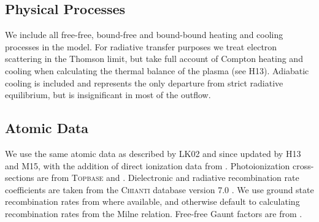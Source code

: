\documentclass[preprint, a4paper, 11pt]{aastex}
\begin{document}
\subsection{Physical Processes}

We include all free-free, bound-free and bound-bound heating
and cooling processes in the model. For radiative transfer purposes
we treat electron scattering in the Thomson limit, 
but take full account of Compton heating and cooling when
calculating the thermal balance of the plasma (see H13).
Adiabatic cooling is included and represents the only
departure from strict radiative equilibrium, but is insignificant 
in most of the outflow.



\subsection{Atomic Data}

We use the same atomic data as described by LK02 and since updated by H13 and M15, 
with the addition of direct ionization data from \cite{dere2007}. 
Photoionization cross-sections are from \textsc{Topbase} \citep{cunto1993} and  \cite{vfky}.
Dielectronic and radiative recombination rate coefficients are taken from 
the \textsc{Chianti} database version 7.0 \citep{dere1997,landi2012}.
We use ground state recombination rates from \cite{badnell2006} where available,
and otherwise default to calculating recombination rates from the Milne
relation. Free-free Gaunt factors are from \cite{sutherland1998}.
\end{document}
